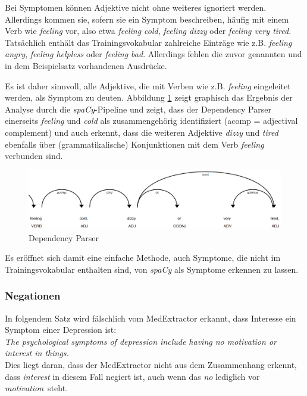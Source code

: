 Bei Symptomen können Adjektive nicht ohne weiteres ignoriert werden. Allerdings kommen sie, sofern sie ein Symptom beschreiben, häufig mit einem Verb wie \emph{feeling} vor, also etwa \emph{feeling cold}, \emph{feeling dizzy} oder \emph{feeling very tired}. Tatsächlich enthält das Trainingsvokabular zahlreiche Einträge wie z.B. \emph{feeling angry}, \emph{feeling helpless} oder \emph{feeling bad}. Allerdings fehlen die zuvor genannten und in dem Beispielsatz vorhandenen Ausdrücke.

Es ist daher sinnvoll, alle Adjektive, die mit Verben wie z.B. \emph{feeling} eingeleitet werden, als Symptom zu deuten. Abbildung \ref{fig:dep_parser} zeigt graphisch das Ergebnis der Analyse durch die \emph{spaCy}-Pipeline und zeigt, dass der Dependency Parser einerseits \emph{feeling} und \emph{cold} als zusammengehörig identifiziert (acomp = adjectival complement) und auch erkennt, dass die weiteren Adjektive \emph{dizzy} und \emph{tired} ebenfalls über (grammatikalische) Konjunktionen mit dem Verb \emph{feeling} verbunden sind.

\begin{figure}[h]
    \centering
    \includegraphics[width=\textwidth]{pictures/Dep_Parser.png}
    \caption{Dependency Parser}
    \label{fig:dep_parser}
\end{figure}

Es eröffnet sich damit eine einfache Methode, auch Symptome, die nicht im Trainingsvokabular enthalten sind, von \emph{spaCy} als Symptome erkennen zu lassen.

\subsubsection{Negationen}
\label{subsec: negations} 

In folgendem Satz wird fälschlich vom MedExtractor erkannt, dass Interesse ein Symptom einer Depression ist:\\

\emph{\glqq The psychological symptoms of depression include having no motivation or interest in things.\grqq}\\

Dies liegt daran, dass der MedExtractor nicht aus dem Zusammenhang erkennt, dass \emph{interest} in diesem Fall negiert ist, auch wenn das \emph{no} lediglich vor \emph{motivation}\ steht. 

